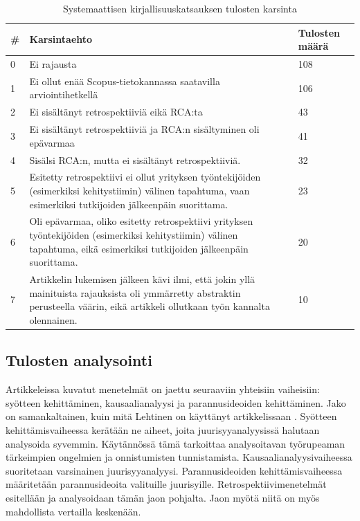 \begin{table}
    \begin{tabular}{|p{0.5cm}|p{11.5cm}|p{2cm}|}
        \hline
        \textbf{\#} & \textbf{Karsintaehto} & \textbf{Tulosten määrä} \\ \hline
        0 & Ei rajausta                                                                                                                                               & 108            \\ \hline
        1 & Ei ollut enää Scopus-tietokannassa saatavilla arviointihetkellä & 106            \\ \hline
        2 & Ei sisältänyt retrospektiiviä eikä RCA:ta                                                                                                                          & 43             \\ \hline
        3 & Ei sisältänyt retrospektiiviä ja RCA:n sisältyminen oli epävarmaa                                                                                                   & 41             \\ \hline
        4 & Sisälsi RCA:n, mutta ei sisältänyt retrospektiiviä.                                                                                                                  & 32             \\ \hline
        5 & Esitetty retrospektiivi ei ollut yrityksen työntekijöiden (esimerkiksi kehitystiimin) välinen tapahtuma, vaan esimerkiksi tutkijoiden jälkeenpäin suorittama.                & 23             \\ \hline
        6 & Oli epävarmaa, oliko esitetty retrospektiivi yrityksen työntekijöiden (esimerkiksi kehitystiimin) välinen tapahtuma, eikä esimerkiksi tutkijoiden jälkeenpäin suorittama.    & 20             \\
        \hline
        7 & Artikkelin lukemisen jälkeen kävi ilmi, että jokin yllä mainituista rajauksista oli ymmärretty abstraktin perusteella väärin, eikä artikkeli ollutkaan työn kannalta olennainen. & 10 \\ \hline
    \end{tabular}
    \caption{Systemaattisen kirjallisuuskatsauksen tulosten karsinta}
    \label{tab:karsintaehdot_taulukko}
\end{table}

\subsection{Tulosten analysointi}
Artikkeleissa kuvatut menetelmät on jaettu seuraaviin yhteisiin vaiheisiin: syötteen kehittäminen, kausaalianalyysi ja parannusideoiden kehittäminen. Jako on samankaltainen, kuin mitä Lehtinen on käyttänyt artikkelissaan \citep{Lehtinen2011}. Syötteen kehittämisvaiheessa kerätään ne aiheet, joita juurisyyanalyysissä halutaan analysoida syvemmin. Käytännössä tämä tarkoittaa analysoitavan työrupeaman tärkeimpien ongelmien ja onnistumisten tunnistamista. Kausaalianalyysivaiheessa suoritetaan varsinainen juurisyyanalyysi. Parannusideoiden kehittämisvaiheessa määritetään parannusideoita valituille juurisyille. Retrospektiivimenetelmät esitellään ja analysoidaan tämän jaon pohjalta. Jaon myötä niitä on myös mahdollista vertailla keskenään.

